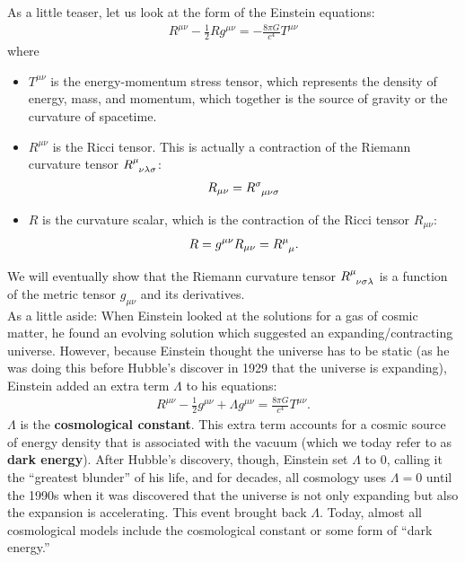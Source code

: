 \documentclass{book}
\theoremstyle{definition}
\begin{document}
As a little teaser, let us look at the form of the Einstein equations:
\begin{align*}
\boxed{R^{\mu\nu} - \frac{1}{2}Rg^{\mu\nu} = -\frac{8\pi G}{c^4}T^{\mu\nu}}
\end{align*}
where \begin{itemize}
	\item $T^{\mu\nu}$ is the energy-momentum stress tensor, which represents the density of energy, mass, and momentum, which together is the source of gravity or the curvature of spacetime. 
	\item $R^{\mu\nu}$ is the Ricci tensor. This is actually a contraction of the Riemann curvature tensor $\tensor{R}{^\mu_{\nu\lambda\sigma}}$:
	\begin{align*}
	R_{\mu\nu} = \tensor{R}{^\sigma_{\mu\nu\sigma}}
	\end{align*}
	\item $R$ is the curvature scalar, which is the contraction of the Ricci tensor $R_{\mu\nu}$:
	\begin{align*}
	R = g^{\mu\nu}R_{\mu\nu} = \tensor{R}{^\mu_\mu}.
	\end{align*}
\end{itemize}
We will eventually show that the Riemann curvature tensor $
\tensor{R}{^{\mu}_{\nu\sigma\lambda}}$ is a function of the metric tensor $g_{\mu\nu}$ and its derivatives.\\

As a little aside: When Einstein looked at the solutions for a gas of cosmic matter, he found an evolving solution which suggested an expanding/contracting universe. However, because Einstein thought the universe has to be static (as he was doing this before Hubble's discover in 1929 that the universe is expanding), Einstein added an extra term $\Lambda$ to his equations:
\begin{align*}
R^{\mu\nu} - \frac{1}{2}g^{\mu\nu} + \Lambda g^{\mu\nu} = \frac{8\pi G}{c^4}T^{\mu\nu}.
\end{align*}
$\Lambda$ is the \textbf{cosmological constant}. This extra term accounts for a cosmic source of energy density that is associated with the vacuum (which we today refer to as \textbf{dark energy}). After Hubble's discovery, though, Einstein set $\Lambda$ to 0, calling it the ``greatest blunder'' of his life, and for decades, all cosmology uses $\Lambda = 0$ until the 1990s when it was discovered that the universe is not only expanding but also the expansion is accelerating. This event brought back $\Lambda$. Today, almost all cosmological models include the cosmological constant or some form of ``dark energy.''\\
\end{document}
